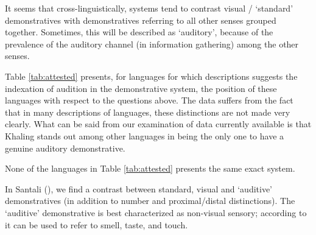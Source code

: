 \documentclass[oldfontcommands,oneside,a4paper,11pt]{article}
\begin{document}
It seems that cross-linguistically, systems tend to contrast visual / ‘standard’ demonstratives  with demonstratives referring to all other senses grouped together. Sometimes, this will be described as ‘auditory’, because of the prevalence of the auditory channel (in information gathering) among the other senses.

    Table \ref{tab:attested} presents, for languages for which descriptions suggests the indexation of audition in the demonstrative system, the position of these languages with respect to the questions above.  The data suffers from the fact that in many descriptions of languages, these distinctions are not made very clearly.  What can be said from our examination of data currently available is that Khaling stands out among other languages in being the only one to have a genuine auditory demonstrative.


 

\begin{table}
\caption{Systems     including auditory demonstratives } \label{tab:attested}
\end{table}	




None of the languages in Table  \ref{tab:attested} presents    the   same exact system.

 

In Santali (\citealt[42-44]{neukom01santali}), we find a contrast between standard, visual and  `auditive' demonstratives (in addition to number and proximal/distal distinctions). The  `auditive' demonstrative is best characterized as non-visual sensory; according to \citet[42]{neukom01santali} it can be used to  refer to smell, taste, and touch.
\end{document}
